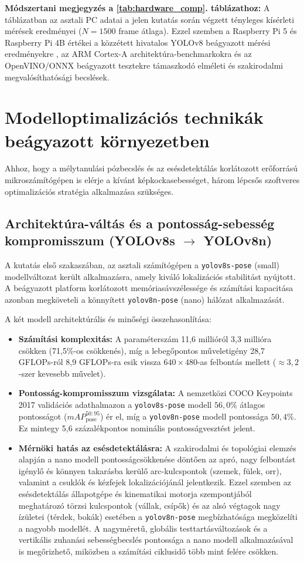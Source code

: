 \documentclass[12pt,a4paper,oneside]{report}
\begin{document}
\textbf{Módszertani megjegyzés a \ref{tab:hardware_comp}. táblázathoz:} A táblázatban az asztali PC adatai a jelen kutatás során végzett tényleges kísérleti mérések eredményei ($N=1500$ frame átlaga). Ezzel szemben a Raspberry Pi 5 és Raspberry Pi 4B értékei a közzétett hivatalos YOLOv8 beágyazott mérési eredményekre \cite{yolov8pose}, az ARM Cortex-A architektúra-benchmarkokra \cite{armneon2020} és az OpenVINO/ONNX beágyazott tesztekre \cite{openvino2022} támaszkodó elméleti és szakirodalmi megvalósíthatósági becslések.

\section{Modelloptimalizációs technikák beágyazott környezetben}
Ahhoz, hogy a mélytanulási pózbecslés és az esésdetektálás korlátozott erőforrású mikroszámítógépen is elérje a kívánt képkockasebességet, három lépcsős szoftveres optimalizációs stratégia alkalmazása szükséges.

\subsection{Architektúra-váltás és a pontosság-sebesség kompromisszum (YOLOv8s $\to$ YOLOv8n)}
A kutatás első szakaszában, az asztali számítógépen a \texttt{yolov8s-pose} (small) modellváltozat került alkalmazásra, amely kiváló lokalizációs stabilitást nyújtott. A beágyazott platform korlátozott memóriasávszélessége és számítási kapacitása azonban megköveteli a könnyített \texttt{yolov8n-pose} (nano) hálózat alkalmazását.

A két modell architektúrális és minőségi összehasonlítása:
\begin{itemize}
    \item \textbf{Számítási komplexitás:} A paraméterszám 11,6 millióról 3,3 millióra csökken (71,5\%-os csökkenés), míg a lebegőpontos műveletigény 28,7 GFLOPs-ról 8,9 GFLOPs-ra esik vissza $640 \times 480$-as felbontás mellett ($\approx 3,2$-szer kevesebb művelet).
    \item \textbf{Pontosság-kompromisszum vizsgálata:} A nemzetközi COCO Keypoints 2017 validációs adathalmazon \cite{coco2014} a \texttt{yolov8s-pose} modell $56{,}0\%$ átlagos pontosságot ($mAP_{\text{pose}}^{50:95}$) ér el, míg a \texttt{yolov8n-pose} modell pontossága $50{,}4\%$. Ez mintegy 5,6 százalékpontos nominális pontosságvesztést jelent.
    \item \textbf{Mérnöki hatás az esésdetektálásra:} A szakirodalmi és topológiai elemzés alapján a nano modell pontosságcsökkenése döntően az apró, nagy felbontást igénylő és könnyen takarásba kerülő arc-kulcspontok (szemek, fülek, orr), valamint a csuklók és kézfejek lokalizációjánál jelentkezik. Ezzel szemben az esésdetektálás állapotgépe és kinematikai motorja szempontjából meghatározó törzsi kulcspontok (vállak, csípők) és az alsó végtagok nagy ízületei (térdek, bokák) esetében a \texttt{yolov8n-pose} megbízhatósága megközelíti a nagyobb modellét. A nagyméretű, globális testtartásváltozások és a vertikális zuhanási sebességbecslés pontossága a nano modell alkalmazásával is megőrizhető, miközben a számítási ciklusidő több mint felére csökken.
\end{itemize}
\end{document}
